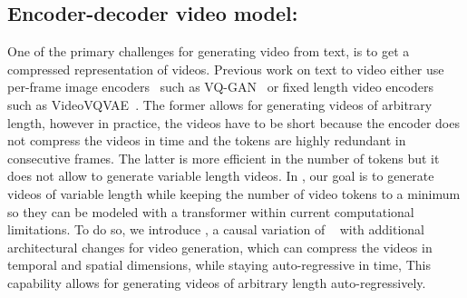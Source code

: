 \subsection{Encoder-decoder video model: \cvivit}
One of the primary challenges for generating video from text, is to get a compressed representation of videos. Previous work on text to video either use per-frame image encoders~\cite{cogvideo,nuwa,harp} such as VQ-GAN~\cite{vqgan} or fixed length video encoders~\cite{godiva} such as VideoVQVAE~\cite{videovqvae}. The former allows for generating videos of arbitrary length, however in practice, the videos have to be short because the encoder does not compress the videos in time and the tokens are highly redundant in consecutive frames. The latter is more efficient in the number of tokens but it does not allow to generate variable length videos. In \model, our goal is to generate videos of variable length while keeping the number of video tokens to a minimum so they can be modeled with a transformer within current computational limitations. To do so, we introduce \cvivit, a causal variation of \vivit~\cite{vivit} with additional architectural changes for video generation, which can compress the videos in temporal and spatial dimensions, while staying auto-regressive in time, This capability allows for generating videos of arbitrary length auto-regressively.

